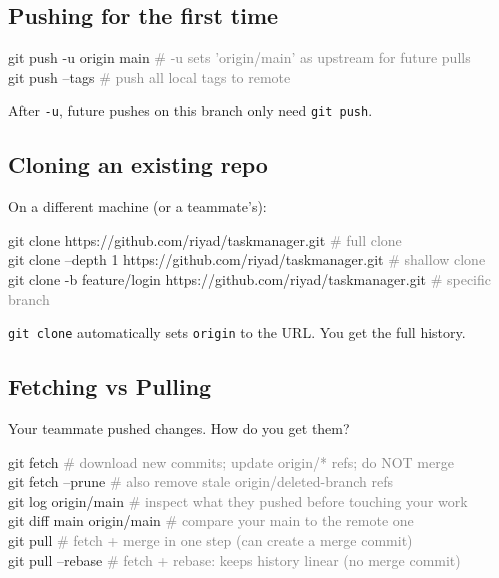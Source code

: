 \documentclass[10pt,a4paper]{article}
\newenvironment{codebox}{%
  \begin{mdframed}[backgroundcolor=codebg, linewidth=0pt,
    innerleftmargin=6pt, innerrightmargin=6pt,
    innertopmargin=4pt, innerbottommargin=4pt]%
  \small\ttfamily
}{%
  \end{mdframed}%
}
\newcommand{\cmd}[1]{\texttt{\small #1}}
\begin{document}
\subsection{Pushing for the first time}
\vspace{0.5em}
\begin{codebox}
git push -u origin main     \textcolor{gray}{\# -u sets 'origin/main' as upstream for future pulls}\\
git push --tags             \textcolor{gray}{\# push all local tags to remote}
\end{codebox}

After \cmd{-u}, future pushes on this branch only need \cmd{git push}.

\subsection{Cloning an existing repo}

On a different machine (or a teammate's):

\begin{codebox}
git clone https://github.com/riyad/taskmanager.git   \textcolor{gray}{\# full clone}\\
git clone --depth 1 https://github.com/riyad/taskmanager.git  \textcolor{gray}{\# shallow clone}\\
git clone -b feature/login https://github.com/riyad/taskmanager.git  \textcolor{gray}{\# specific branch}
\end{codebox}

\cmd{git clone} automatically sets \texttt{origin} to the URL. You get the full history.

\subsection{Fetching vs Pulling}

Your teammate pushed changes. How do you get them?

\begin{codebox}
git fetch                   \textcolor{gray}{\# download new commits; update origin/* refs; do NOT merge}\\
git fetch --prune           \textcolor{gray}{\# also remove stale origin/deleted-branch refs}\\
git log origin/main         \textcolor{gray}{\# inspect what they pushed before touching your work}\\
git diff main origin/main   \textcolor{gray}{\# compare your main to the remote one}\\
git pull                    \textcolor{gray}{\# fetch + merge in one step (can create a merge commit)}\\
git pull --rebase           \textcolor{gray}{\# fetch + rebase: keeps history linear (no merge commit)}
\end{codebox}
\end{document}
